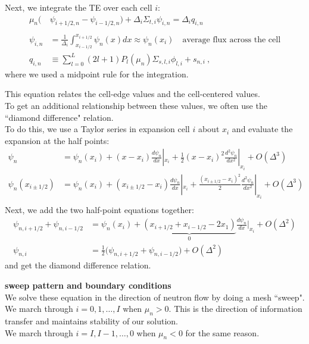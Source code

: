\documentclass[12pt]{article}
\begin{document}
%
Next, we integrate the TE over each cell $i$:
\begin{align*}
\mu_n\bigl(&\psi_{i+1/2,n} - \psi_{i-1/2,n} \bigr) + \Delta_i \Sigma_{t,i} \psi_{i,n} = \Delta_i q_{i,n}\\
&\\
\psi_{i,n} &= \frac{1}{\Delta_i}\int_{x_{i-1/2}}^{x_{i+1/2}} \psi_n(x) dx \approx \psi_n(x_i) \quad \text{average flux across the cell}\\
q_{i,n} &\equiv \sum_{l=0}^L (2l+1) P_l(\mu_n) \Sigma_{s,l,i} \phi_{l,i} + s_{n,i}\:,
\end{align*}
where we used a midpoint rule for the integration.

This equation relates the cell-edge values and the cell-centered values.\\
To get an additional relationship between these values, we often use the ``diamond difference" relation.\\
To do this, we use a Taylor series in expansion cell $i$ about $x_i$ and evaluate the expansion at the half points:
\begin{align*}
\psi_n &= \psi_n(x_i) + (x - x_i)\frac{d\psi_n}{dx}|_{x_i} + \frac{1}{2}(x - x_i)^2 \frac{d^2 \psi_n}{dx^2}|_{x_i} + O(\Delta^3)\\
\psi_{n}(x_{i \pm 1/2}) &= \psi_n(x_i) + (x_{i \pm 1/2} - x_i) \frac{d\psi_n}{dx}|_{x_i} + \frac{(x_{i\pm 1/2} - x_i)^2}{2} \frac{d^2 \psi_n}{dx^2}|_{x_i} + O(\Delta^3)\\
\end{align*}
Next, we add the two half-point equations together:
\begin{align*}
\psi_{n, i+1/2} + \psi_{n, i-1/2} &= \psi_n(x_i) + \underbrace{(x_{i+1/2} + x_{i-1/2} - 2x_1)}_{0} \frac{d \psi_n}{dx}|_{x_i} + O(\Delta^2)\\
\psi_{n, i} &= \frac{1}{2}\bigl(\psi_{n,i+1/2} + \psi_{n,i-1/2}\bigr) + O(\Delta^2)
\end{align*}
and get the diamond difference relation.

\textbf{sweep pattern and boundary conditions}\\
We solve these equation in the direction of neutron flow by doing a mesh ``sweep". \\
We march through $i = 0, 1, \dots, I$ when $\mu_n > 0$. This is the direction of information transfer and maintains stability of our solution.\\
We march through $i = I, I-1, \dots, 0$ when $\mu_n < 0$ for the same reason.
\end{document}
